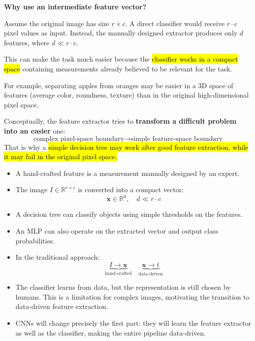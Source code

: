 \highspace
\begin{flushleft}
    \textcolor{Green3}{ \textbf{Why use an intermediate feature vector?}}
\end{flushleft}
Assume the original image has size $r \times c$. A direct classifier would receive $r \cdot c$ pixel values as input. Instead, the manually designed extractor produces only $d$ features, where $d \ll r \cdot c$.

\highspace
\textcolor{Green3}{} This can make the task much easier because the \hl{classifier works in a compact space} containing measurements already believed to be relevant for the task.

\highspace
For example, separating apples from oranges may be easier in a 3D space of features (average color, roundness, texture) than in the original high-dimensional pixel space.

\highspace
Conceptually, the feature extractor tries to \textbf{transform a difficult problem into an easier} one:
\begin{equation*}
    \text{complex pixel-space boundary} \to \text{simple feature-space boundary}
\end{equation*}
That is why a \hl{simple decision tree may work after good feature extraction, while it may fail in the original pixel space.}

\highspace
\begin{takeawaysbox}
    \begin{itemize}
        \item A hand-crafted feature is a measurement manually designed by an expert.
        \item The image $I \in \mathbb{R}^{r \times c}$ is converted into a compact vector:
        \begin{equation*}
            \mathbf{x} \in \mathbb{R}^d, \quad d \ll r \cdot c
        \end{equation*}
        \item A decision tree can classify objects using simple thresholds on the features.
        \item An MLP can also operate on the extracted vector and output class probabilities.
        \item In the traditional approach:
        \begin{equation*}
            \underbrace{I \to \mathbf{x}}_{\text{hand-crafted}} \quad \underbrace{\mathbf{x} \to t}_{\text{data-driven}}
        \end{equation*}
        \item The classifier learns from data, but the representation is still chosen by humans. This is a limitation for complex images, motivating the transition to data-driven feature extraction.
        \item CNNs will change precisely the first part: they will learn the feature extractor as well as the classifier, making the entire pipeline data-driven.
    \end{itemize}
\end{takeawaysbox}